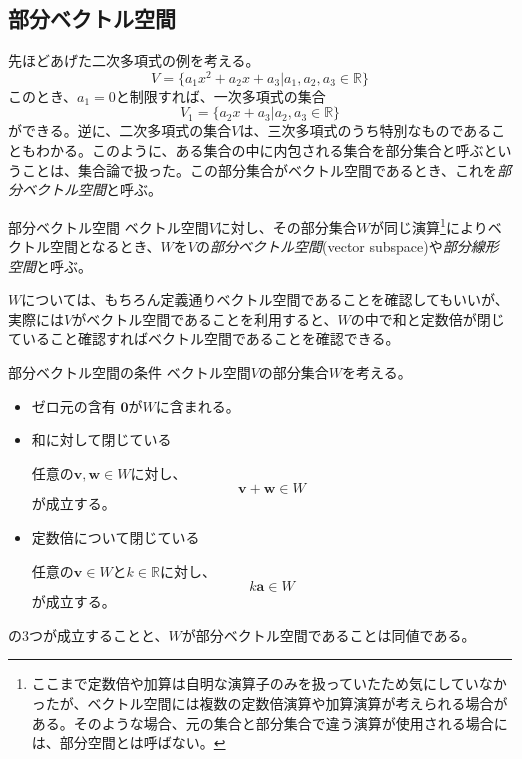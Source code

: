 \subsection{部分ベクトル空間}
先ほどあげた二次多項式の例を考える。
\begin{equation}
	V=\{a_1 x^2+a_2 x+a_3|a_1,a_2,a_3 \in \mathbb{R}\}
\end{equation}
このとき、\(a_1=0\)と制限すれば、一次多項式の集合
\begin{equation}
	V_1=\{a_2 x+a_3|a_2,a_3 \in \mathbb{R}\}
\end{equation}
ができる。逆に、二次多項式の集合\(V\)は、三次多項式のうち特別なものであることもわかる。このように、ある集合の中に内包される集合を部分集合と呼ぶということは、集合論で扱った。この部分集合がベクトル空間であるとき、これを\emph{部分ベクトル空間}と呼ぶ。
\begin{definition*}{部分ベクトル空間}
	ベクトル空間\(V\)に対し、その部分集合\(W\)が同じ演算\footnote{ここまで定数倍や加算は自明な演算子のみを扱っていたため気にしていなかったが、ベクトル空間には複数の定数倍演算や加算演算が考えられる場合がある。そのような場合、元の集合と部分集合で違う演算が使用される場合には、部分空間とは呼ばない。}によりベクトル空間となるとき、\(W\)を\(V\)の\emph{部分ベクトル空間}(vector subspace)や\emph{部分線形空間}と呼ぶ。
\end{definition*}

\(W\)については、もちろん定義通りベクトル空間であることを確認してもいいが、実際には\(V\)がベクトル空間であることを利用すると、\(W\)の中で和と定数倍が閉じていること確認すればベクトル空間であることを確認できる。

\begin{theorem*}{部分ベクトル空間の条件}
	ベクトル空間\(V\)の部分集合\(W\)を考える。
	\begin{itemize}
		\item ゼロ元の含有
		      \(\boldsymbol{0}\)が\(W\)に含まれる。
		\item 和に対して閉じている

		      任意の\(\boldsymbol{v},\boldsymbol{w} \in W\)に対し、
		      \begin{equation}
			      \boldsymbol{v}+\boldsymbol{w} \in W
		      \end{equation}
		      が成立する。
		\item 定数倍について閉じている

		      任意の\(\boldsymbol{v}\in W\)と\(k \in \mathbb{R}\)に対し、
		      \begin{equation}
			      k\boldsymbol{a} \in W
		      \end{equation}
		      が成立する。
	\end{itemize}
	の3つが成立することと、\(W\)が部分ベクトル空間であることは同値である。
\end{theorem*}


